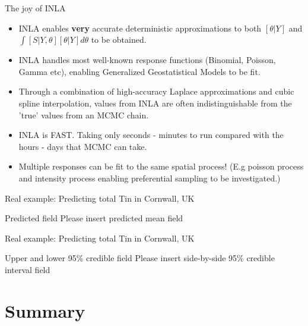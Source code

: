\documentclass{beamer}
\begin{document}
\begin{frame}{The joy of INLA}

\begin{itemize}
\item INLA enables \textbf{very} accurate deterministic approximations to both $[\theta | Y]$ and $\int [S | Y, \theta ] [ \theta | Y ] d \theta$ to be obtained.
\item INLA handles most well-known response functions (Binomial, Poisson, Gamma etc), enabling Generalized Geostatistical Models to be fit.
\item Through a combination of high-accuracy Laplace approximations and cubic spline interpolation, values from INLA are often indistinguishable from the 'true' values from an MCMC chain.
\item INLA is FAST. Taking only seconds - minutes to run compared with the hours - days that MCMC can take. 
\item Multiple responses can be fit to the same spatial process! (E.g poisson process and intensity process enabling preferential sampling to be investigated.)
\end{itemize}

\end{frame}

\begin{frame}{Real example: Predicting total Tin in Cornwall, UK}
\begin{block}{Predicted field}
Please insert predicted mean field
\end{block}

\end{frame}

\begin{frame}{Real example: Predicting total Tin in Cornwall, UK}
\begin{block}{Upper and lower 95\% credible field}
Please insert side-by-side 95\% credible interval field
\end{block}
\end{frame}
\section*{Summary}
\end{document}
